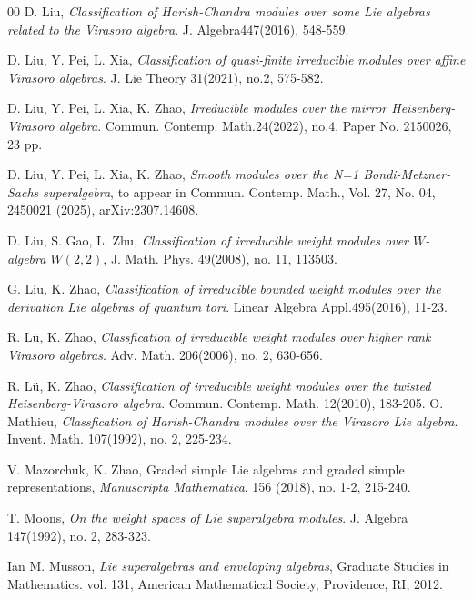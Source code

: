 \documentclass[1p]{elsarticle}
\numberwithin{equation}{section}
\begin{document}
\begin{thebibliography}{00}
 D. Liu, {\it Classification of Harish-Chandra modules over some Lie algebras related to the Virasoro algebra}. J. Algebra447(2016), 548-559.

 

 D. Liu, Y. Pei, L. Xia, {\it Classification of quasi-finite irreducible modules over affine Virasoro algebras}. J. Lie Theory 31(2021), no.2, 575-582.

 D. Liu, Y. Pei, L.  Xia, K. Zhao,  {\it Irreducible modules over the mirror Heisenberg-Virasoro algebra}. Commun. Contemp. Math.24(2022), no.4, Paper No. 2150026, 23 pp.

  D. Liu, Y. Pei, L.  Xia, K. Zhao,  {\it Smooth modules over the N=1 Bondi-Metzner-Sachs superalgebra}, to appear in Commun. Contemp. Math., Vol. 27, No. 04, 2450021 (2025), arXiv:2307.14608.


 D. Liu, S. Gao, L. Zhu, {\it Classification of irreducible weight modules over $W$-algebra $W(2,2)$}, J. Math. Phys. 49(2008), no. 11, 113503.


 G. Liu, K. Zhao, {\it Classification of irreducible bounded weight modules over the derivation Lie algebras of quantum tori}. Linear Algebra Appl.495(2016), 11-23.


 R. L\"{u}, K. Zhao, {\it Classfication of irreducible weight modules over higher rank Virasoro algebras}. Adv. Math. 206(2006), no. 2, 630-656.

 R. L\"{u}, K. Zhao, {\it Classification of irreducible weight modules over the twisted Heisenberg-Virasoro algebra}. Commun. Contemp. Math. 12(2010), 183-205.
 O. Mathieu, {\it Classfication of Harish-Chandra modules over the Virasoro Lie algebra}. Invent. Math. 107(1992), no. 2, 225-234.

V. Mazorchuk,  K. Zhao, Graded simple Lie algebras and graded simple representations,  {\it Manuscripta Mathematica},  156  (2018),  no. 1-2, 215-240. 

 T. Moons, {\it On the weight spaces of Lie superalgebra modules}. J. Algebra 147(1992), no. 2, 283-323.

 Ian M. Musson, {\it Lie superalgebras and enveloping algebras}, Graduate Studies in Mathematics.
vol. 131, American Mathematical Society, Providence, RI, 2012.


\end{thebibliography}
\end{document}
